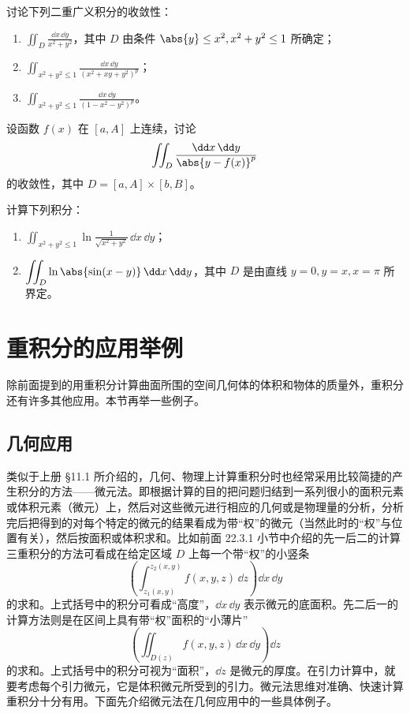 \begin{xexercise}[4]
讨论下列二重广义积分的收敛性：
  \begin{enumerate}[label=(\arabic*)]
    \item $\displaystyle\iint_D\frac{\dd x\,\dd y}{x^2+y^2}$，其中 $D$ 由条件 $\abs{y}\le x^2,x^2+y^2\le1$ 所确定；
    \item $\displaystyle\iint_{x^2+y^2\le1}\frac{\dd x\,\dd y}{(x^2+xy+y^2)^p}$；
    \item $\displaystyle\iint_{x^2+y^2\le1}\frac{\dd x\,\dd y}{(1-x^2-y^2)^p}$。
  \end{enumerate}
\end{xexercise}

\begin{xexercise}[5]
设函数 $f(x)$ 在 $[a,A]$ 上连续，讨论
  \[
    \iint_D\frac{\dd x\,\dd y}{\abs{y-f(x)}^p}
  \]
  的收敛性，其中 $D=[a,A]\times[b,B]$。
\end{xexercise}

\begin{xexercise}[6]
计算下列积分：
  \begin{enumerate}[label=(\arabic*)]
    \item $\displaystyle\iint_{x^2+y^2\le1}\ln\frac1{\sqrt{x^2+y^2}}\,\dd x\,\dd y$；
    \item $\displaystyle\iint_D\ln\abs{\sin(x-y)}\,\dd x\,\dd y$，其中 $D$ 是由直线 $y=0,y=x,x=\pi$ 所界定。
  \end{enumerate}
\end{xexercise}

\section{重积分的应用举例}

除前面提到的用重积分计算曲面所围的空间几何体的体积和物体的质量外，重积分还有许多其他应用。本节再举一些例子。

\subsection{几何应用}

类似于上册 §11.1 所介绍的，几何、物理上计算重积分时也经常采用比较简捷的产生积分的方法——微元法。即根据计算的目的把问题归结到一系列很小的面积元素或体积元素（微元）上，然后对这些微元进行相应的几何或是物理量的分析，分析完后把得到的对每个特定的微元的结果看成为带“权”的微元（当然此时的“权”与位置有关），然后按面积或体积求和。比如前面 22.3.1 小节中介绍的先一后二的计算三重积分的方法可看成在给定区域 $D$ 上每一个带“权”的小竖条
\[
  \left(\int_{z_1(x,y)}^{z_2(x,y)}f(x,y,z)\,\dd z\right)\dd x\,\dd y
\]
的求和。上式括号中的积分可看成“高度”，$\dd x\,\dd y$ 表示微元的底面积。先二后一的计算方法则是在区间上具有带“权”面积的“小薄片”
\[
  \left(\iint_{D(z)}f(x,y,z)\,\dd x\,\dd y\right)\dd z
\]
的求和。上式括号中的积分可视为“面积”，$\dd z$ 是微元的厚度。在引力计算中，就要考虑每个引力微元，它是体积微元所受到的引力。微元法思维对准确、快速计算重积分十分有用。下面先介绍微元法在几何应用中的一些具体例子。


